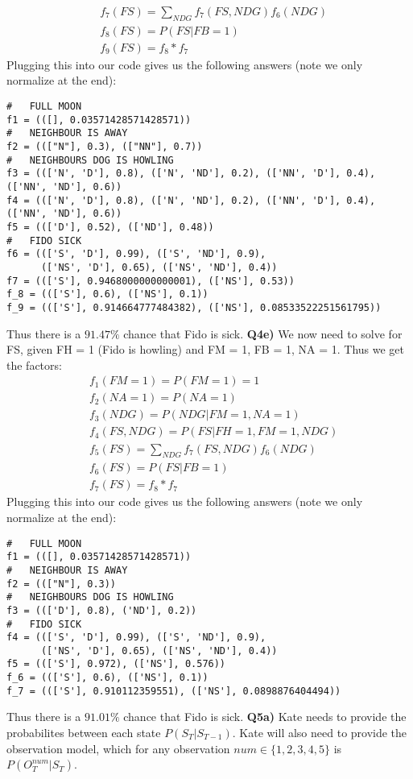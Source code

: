 \documentclass{article}
\begin{document}
\begin{titlepage}
\begin{align*}
& f_7(FS) = \sum_{NDG} f_7(FS, NDG)f_6(NDG)  \\
& f_8(FS) = P(FS |FB = 1) \\
& f_9(FS) = f_8*f_7
\end{align*}
Plugging this into our code gives us the following answers (note we only normalize at the end):
\begin{lstlisting}
#   FULL MOON
f1 = (([], 0.03571428571428571))
#   NEIGHBOUR IS AWAY
f2 = ((["N"], 0.3), (["NN"], 0.7))
#   NEIGHBOURS DOG IS HOWLING
f3 = ((['N', 'D'], 0.8), (['N', 'ND'], 0.2), (['NN', 'D'], 0.4), (['NN', 'ND'], 0.6))
f4 = ((['N', 'D'], 0.8), (['N', 'ND'], 0.2), (['NN', 'D'], 0.4), (['NN', 'ND'], 0.6))
f5 = ((['D'], 0.52), (['ND'], 0.48))
#   FIDO SICK
f6 = ((['S', 'D'], 0.99), (['S', 'ND'], 0.9), 
	  (['NS', 'D'], 0.65), (['NS', 'ND'], 0.4))
f7 = ((['S'], 0.9468000000000001), (['NS'], 0.53))
f_8 = ((['S'], 0.6), (['NS'], 0.1))
f_9 = ((['S'], 0.914664777484382), (['NS'], 0.08533522251561795))
\end{lstlisting}
Thus there is a $91.47\%$ chance that Fido is sick.
\newpage
\textbf{Q4e)} We now need to solve for FS, given FH = 1 (Fido is howling) and FM = 1, FB = 1, NA = 1. Thus we get the factors:
\begin{align*}
& f_1(FM = 1) = P(FM = 1) = 1 \\ 
& f_2(NA = 1) = P(NA = 1) \\
& f_3(NDG) = P(NDG | FM = 1, NA = 1) \\
& f_4(FS, NDG) = P(FS | FH = 1, FM = 1, NDG) \\
& f_5(FS) = \sum_{NDG} f_7(FS, NDG)f_6(NDG)  \\
& f_6(FS) = P(FS |FB = 1) \\
& f_7(FS) = f_8*f_7
\end{align*}
Plugging this into our code gives us the following answers (note we only normalize at the end):
\begin{lstlisting}
#   FULL MOON
f1 = (([], 0.03571428571428571))
#   NEIGHBOUR IS AWAY
f2 = ((["N"], 0.3))
#   NEIGHBOURS DOG IS HOWLING
f3 = ((['D'], 0.8), ('ND'], 0.2))
#   FIDO SICK
f4 = ((['S', 'D'], 0.99), (['S', 'ND'], 0.9), 
	  (['NS', 'D'], 0.65), (['NS', 'ND'], 0.4))
f5 = ((['S'], 0.972), (['NS'], 0.576))
f_6 = ((['S'], 0.6), (['NS'], 0.1))
f_7 = ((['S'], 0.910112359551), (['NS'], 0.0898876404494))
\end{lstlisting}
Thus there is a $91.01\%$ chance that Fido is sick.
\newpage
\textbf{Q5a)} Kate needs to provide the probabilites between each state $P(S_T | S_{T-1})$. Kate will also need to provide the observation model, which for any observation $num \in \{1,2,3,4,5\}$ is $P(O^{num}_T | S_T)$.\\\\

\end{titlepage}
\end{document}
